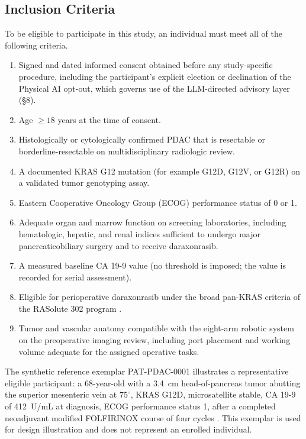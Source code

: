 \subsection{Inclusion Criteria}

To be eligible to participate in this study, an individual must meet all of the
following criteria.

\begin{enumerate}[leftmargin=1.6em,itemsep=2pt,topsep=2pt]
\item Signed and dated informed consent obtained before any study-specific
procedure, including the participant's explicit election or declination of the
Physical AI opt-out, which governs use of the LLM-directed advisory layer (\S8).
\item Age $\geq 18$ years at the time of consent.
\item Histologically or cytologically confirmed PDAC that is resectable or
borderline-resectable on multidisciplinary radiologic review.
\item A documented KRAS G12 mutation (for example G12D, G12V, or G12R) on a
validated tumor genotyping assay.
\item Eastern Cooperative Oncology Group (ECOG) performance status of 0 or 1.
\item Adequate organ and marrow function on screening laboratories, including
hematologic, hepatic, and renal indices sufficient to undergo major
pancreaticobiliary surgery and to receive daraxonrasib.
\item A measured baseline CA 19-9 value (no threshold is imposed; the value is
recorded for serial assessment).
\item Eligible for perioperative daraxonrasib under the broad pan-KRAS criteria of
the RASolute 302 program \cite{rasolute302}.
\item Tumor and vascular anatomy compatible with the eight-arm robotic system on
the preoperative imaging review, including port placement and working volume
adequate for the assigned operative tasks.
\end{enumerate}

The synthetic reference exemplar PAT-PDAC-0001 illustrates a representative
eligible participant: a 68-year-old with a 3.4~cm head-of-pancreas tumor abutting
the superior mesenteric vein at $75^\circ$, KRAS G12D, microsatellite stable,
CA 19-9 of 412~U/mL at diagnosis, ECOG performance status 1, after a completed
neoadjuvant modified FOLFIRINOX course of four cycles \cite{Conroy2018}. This
exemplar is used for design illustration and does not represent an enrolled
individual.

